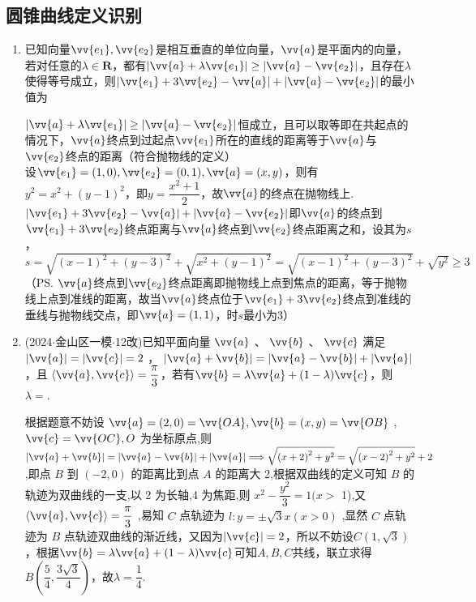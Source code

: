 \subsection*{圆锥曲线定义识别}
\begin{enumerate}
    \item 已知向量$\vv{e_1}, \vv{e_2}$是相互垂直的单位向量，$\vv{a}$是平面内的向量，若对任意的$\lambda \in \mathbf{R}$，都有$|\vv{a}+\lambda \vv{e_1}| \geq |\vv{a} - \vv{e_2}|$，且存在$\lambda$使得等号成立，则$|\vv{e_1}+3\vv{e_2}-\vv{a}| + |\vv{a} - \vv{e_2}|$的最小值为
    \begin{jieda}
        $|\vv{a}+\lambda \vv{e_1}| \geq |\vv{a} - \vv{e_2}|$恒成立，且可以取等即在共起点的情况下，$\vv{a}$终点到过起点$\vv{e_1}$所在的直线的距离等于$\vv{a}$与$\vv{e_2}$终点的距离（符合抛物线的定义） \\
        设$\vv{e_1} = (1, 0), \vv{e_2} = (0, 1), \vv{a} = (x, y)$，则有$y^2 = x^2 + (y-1)^2$，即$y = \dfrac{x^2+1}{2}$，故$\vv{a}$的终点在抛物线上. \\
        $|\vv{e_1}+3\vv{e_2}-\vv{a}| + |\vv{a} - \vv{e_2}|$即$\vv{a}$的终点到$\vv{e_1}+3\vv{e_2}$终点距离与$\vv{a}$终点到$\vv{e_2}$终点距离之和，设其为$s$，$s = \sqrt{(x-1)^2+(y-3)^2} + \sqrt{x^2 + (y-1)^2} = \sqrt{(x-1)^2+(y-3)^2}+\sqrt{y^2} \geq 3$
        （\ps $\vv{a}$终点到$\vv{e_2}$终点距离即抛物线上点到焦点的距离，等于抛物线上点到准线的距离，故当$\vv{a}$终点位于$\vv{e_1}+3\vv{e_2}$终点到准线的垂线与抛物线交点，即$\vv{a} = (1,1)$，时$s$最小为3）
    \end{jieda}

    \item (2024$\cdot$金山区一模$\cdot$12改)已知平面向量 $\vv{a}$ 、 $\vv{b}$ 、 $\vv{c}$ 满足 $\left| \vv{a}\right| = |\vv{c}| = 2$ ， $\left| {\vv{a} + \vv{b}}\right|  = \left| {\vv{a} - \vv{b}}\right|  + \left| \vv{a}\right|$ ，且 $\langle \vv{a},\vv{c}\rangle  = \dfrac{\pi }{3}$，若有$\vv{b} = \lambda \vv{a} + (1-\lambda)\vv{c}$，则 $\lambda = $.
    \begin{jieda}
        根据题意不妨设 $\vv{a} = \left( {2,0}\right)  = \vv{OA},\vv{b} = \left( {x,y}\right)  = \vv{OB}$ , $\vv{c} = \vv{OC},O$ 为坐标原点,则 $\left| {\vv{a} + \vv{b}}\right|  = \left| {\vv{a} - \vv{b}}\right|  + \left| \vv{a}\right|  \Longrightarrow  \sqrt{{\left( x + 2\right) }^{2} + {y}^{2}} = \sqrt{{\left( x - 2\right) }^{2} + {y}^{2}} + 2$ ,即点 $B$ 到 $\left( {-2,0}\right)$ 的距离比到点 $A$ 的距离大 2,根据双曲线的定义可知 $B$ 的轨迹为双曲线的一支,以 2 为长轴,4 为焦距,则 ${x}^{2} - \dfrac{{y}^{2}}{3} = 1(x >$ 1),又 $\langle \vv{a},\vv{c}\rangle  = \dfrac{\pi }{3}$ ,易知 $C$ 点轨迹为 $l : y =  \pm  \sqrt{3}x\left( {x > 0}\right)$ ,显然 $C$ 点轨迹为 $B$ 点轨迹双曲线的渐近线，又因为$|\vv{c}| = 2$，所以不妨设$C(1, \sqrt{3})$，根据$\vv{b} = \lambda \vv{a} + (1-\lambda)\vv{c}$可知$A, B, C$共线，联立求得$B\left(\dfrac{5}{4}, \dfrac{3\sqrt{3}}{4}\right)$，故$\lambda = \dfrac{1}{4}$.
    \end{jieda}


\end{enumerate}
